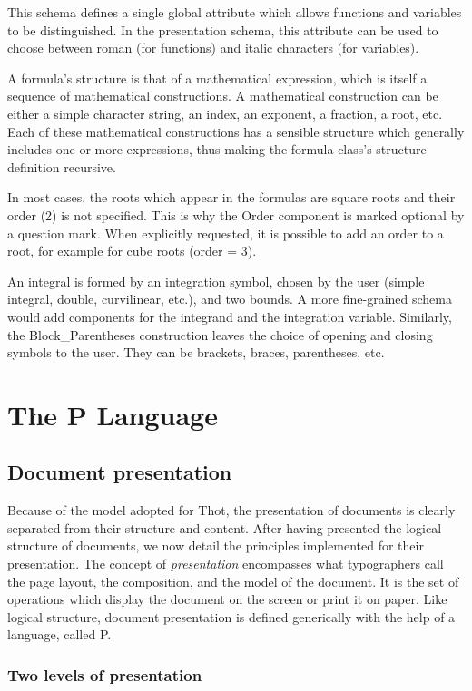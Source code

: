 This schema defines a single global attribute which allows functions
and variables to be distinguished.  In the presentation schema, this
attribute can be used to choose between roman (for functions) and
italic characters (for variables).

A formula's structure is that of a mathematical expression, which is
itself a sequence of mathematical constructions.  A mathematical
construction can be either a simple character string, an index, an
exponent, a fraction, a root, etc.  Each of these mathematical
constructions has a sensible structure which generally includes one or
more expressions, thus making the formula class's structure definition
recursive.

In most cases, the roots which appear in the formulas are square roots
and their order (2) is not specified.  This is why the Order
component is marked optional by a question mark.  When explicitly
requested, it is possible to add an order to a root, for example for
cube roots (order = 3).

An integral is formed by an integration symbol, chosen by the user
(simple integral, double, curvilinear, etc.), and two bounds.  A
more fine-grained schema would add components for the integrand and
the integration variable.  Similarly, the Block\_Parentheses
construction leaves the choice of opening and closing symbols to the
user.  They can be brackets, braces, parentheses, etc.

\chapter{The P Language}

\section{Document presentation}

Because of the model adopted for Thot, the presentation of documents
is clearly separated from their structure and content.  After having
presented the logical structure of documents, we now detail the
principles implemented for their presentation.  The concept of {\em
presentation} encompasses what typographers call the page layout, the
composition, and the model of the document.  It is the set of
operations which display the document on the screen or print it on
paper.  Like logical structure, document presentation is defined
generically with the help of a language, called P.

\subsection{Two levels of presentation}

